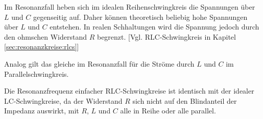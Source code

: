 \begin{frame}
{%
Im Resonanzfall heben sich im idealen Reihenschwingkreis die Spannungen über $L$ und $C$ gegenseitig auf.
Daher können theoretisch beliebig hohe Spannungen über $L$ und $C$ entstehen.
In realen Schhaltungen wird die Spannung jedoch durch den ohmschen Widerstand $R$ begrenzt. 
[Vgl. RLC-Schwingkreis in Kapitel \ref{sec:resonanzkreise:rlcs}]

Analog gilt das gleiche im Resonanzfall für die Ströme durch $L$ und $C$ im Parallelschwingkreis.

Die Resonanzfrequenz einfacher RLC-Schwingkreise ist identisch mit der idealer LC-Schwingkreise,
da der Widerstand $R$ sich nicht auf den Blindanteil der Impedanz auswirkt,
mit $R$, $L$ und $C$ alle in Reihe oder alle parallel.

}
\end{frame}
